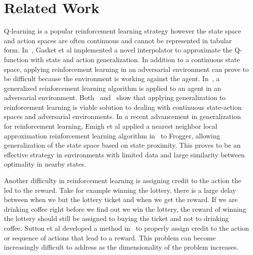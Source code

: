 \section{Related Work}

Q-learning is a popular reinforcement learning strategy however the state space and action spaces are often continuous and cannot be represented in tabular form. In~\cite{gaskett}, Gasket et al implemented a novel interpolator to approximate the Q-function with state and action generalization. In addition to a continuous state space, applying reinforcement learning in an adversarial environment can prove to be difficult because the environment is working against the agent. In~\cite{uther}, a generalized reinforcement learning algorithm is applied to an agent in an adversarial environment. Both~\cite{gaskett} and~\cite{uther} show that applying generalization to reinforcement learning is viable solution to dealing with continuous state-action spaces and adversarial environments. In a recent advancement in generalization for reinforcement learning, Emigh et al applied a nearest neighbor local approximation reinforcement learning algorithm in~\cite{emigh} to Frogger, allowing generalization of the state space based on state proximity. This proves to be an effective strategy in environments with limited data and large similarity between optimality in nearby states.

Another difficulty in reinforcement learning is assigning credit to the action the led to the reward. Take for example winning the lottery, there is a large delay between when we but the lottery ticket and when we get the reward. If we are drinking coffee right before we find out we win the lottery, the reward of winning the lottery should still be assigned to buying the ticket and not to drinking coffee. Sutton et al developed a method in~\cite{sutton} to properly assign credit to the action or sequence of actions that lead to a reward. This problem can become increasingly difficult to address as the dimensionality of the problem increases.       
